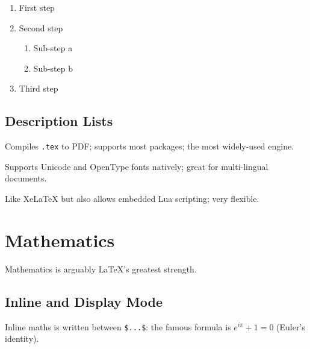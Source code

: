 \documentclass[12pt, a4paper]{article}
\theoremstyle{definition}
\theoremstyle{plain}
\theoremstyle{remark}
\begin{document}
\begin{enumerate}[label=\textbf{\arabic*.}]  %
  \item First step
  \item Second step
    \begin{enumerate}[label=\textbf{\alph*.}]
      \item Sub-step a
      \item Sub-step b
    \end{enumerate}
  \item Third step
\end{enumerate}

\subsection{Description Lists}

\begin{description}[style=nextline, leftmargin=2em]
  \item[\textcolor{PrimaryBlue}{pdfLaTeX}]
        Compiles \texttt{.tex} to PDF; supports most packages; the most
        widely-used engine.
  \item[\textcolor{PrimaryBlue}{XeLaTeX}]
        Supports Unicode and OpenType fonts natively; great for
        multi-lingual documents.
  \item[\textcolor{PrimaryBlue}{LuaLaTeX}]
        Like XeLaTeX but also allows embedded Lua scripting; very flexible.
\end{description}


\section{Mathematics}
\label{sec:math}

Mathematics is arguably \LaTeX{}'s greatest strength.

\subsection{Inline and Display Mode}

Inline maths is written between \verb|$...$|: the famous formula is
$e^{i\pi} + 1 = 0$ (Euler's identity).
\end{document}
